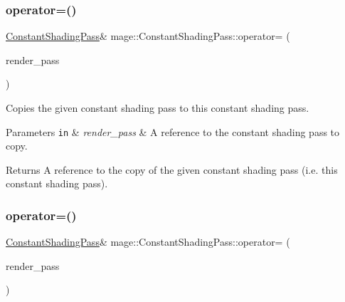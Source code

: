 \subsubsection{\texorpdfstring{operator=()}{operator=()}\hspace{0.1cm}{\footnotesize\ttfamily [1/2]}}
{\footnotesize\ttfamily \hyperlink{classmage_1_1_constant_shading_pass}{Constant\+Shading\+Pass}\& mage\+::\+Constant\+Shading\+Pass\+::operator= (\begin{DoxyParamCaption}\item[{const \hyperlink{classmage_1_1_constant_shading_pass}{Constant\+Shading\+Pass} \&}]{render\+\_\+pass }\end{DoxyParamCaption})\hspace{0.3cm}{\ttfamily [delete]}}

Copies the given constant shading pass to this constant shading pass.


\begin{DoxyParams}[1]{Parameters}
\mbox{\tt in}  & {\em render\+\_\+pass} & A reference to the constant shading pass to copy. \\
\hline
\end{DoxyParams}
\begin{DoxyReturn}{Returns}
A reference to the copy of the given constant shading pass (i.\+e. this constant shading pass). 
\end{DoxyReturn}
\hypertarget{classmage_1_1_constant_shading_pass_ae5ea38d9739b1a16257ee0a69c95b406}{}\label{classmage_1_1_constant_shading_pass_ae5ea38d9739b1a16257ee0a69c95b406} 
\subsubsection{\texorpdfstring{operator=()}{operator=()}\hspace{0.1cm}{\footnotesize\ttfamily [2/2]}}
{\footnotesize\ttfamily \hyperlink{classmage_1_1_constant_shading_pass}{Constant\+Shading\+Pass}\& mage\+::\+Constant\+Shading\+Pass\+::operator= (\begin{DoxyParamCaption}\item[{\hyperlink{classmage_1_1_constant_shading_pass}{Constant\+Shading\+Pass} \&\&}]{render\+\_\+pass }\end{DoxyParamCaption})\hspace{0.3cm}{\ttfamily [delete]}}

